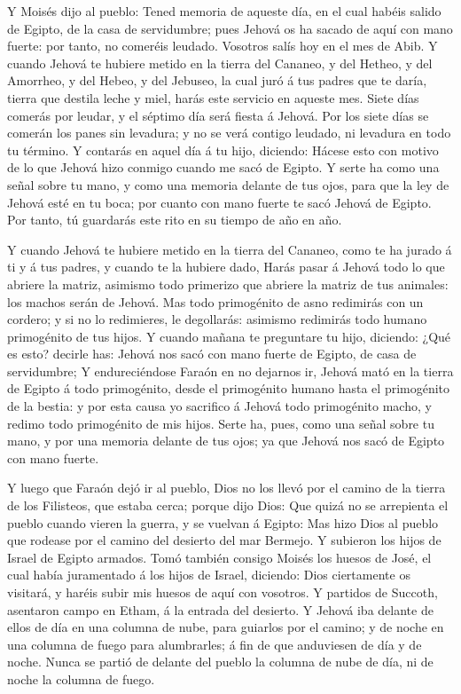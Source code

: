  Y Moisés dijo al pueblo: Tened memoria de aqueste día, en
el cual habéis salido de Egipto, de la casa de servidumbre; pues Jehová
os ha sacado de aquí con mano fuerte: por tanto, no comeréis leudado.
 Vosotros salís hoy en el mes de Abib.  Y cuando
Jehová te hubiere metido en la tierra del Cananeo, y del Hetheo, y del
Amorrheo, y del Hebeo, y del Jebuseo, la cual juró á tus padres que te
daría, tierra que destila leche y miel, harás este servicio en aqueste
mes.  Siete días comerás por leudar, y el séptimo día será
fiesta á Jehová.  Por los siete días se comerán los panes
sin levadura; y no se verá contigo leudado, ni levadura en todo tu
término.  Y contarás en aquel día á tu hijo, diciendo:
Hácese esto con motivo de lo que Jehová hizo conmigo cuando me sacó de
Egipto.  Y serte ha como una señal sobre tu mano, y como una
memoria delante de tus ojos, para que la ley de Jehová esté en tu boca;
por cuanto con mano fuerte te sacó Jehová de Egipto.  Por
tanto, tú guardarás este rito en su tiempo de año en año.

 Y cuando Jehová te hubiere metido en la tierra del
Cananeo, como te ha jurado á ti y á tus padres, y cuando te la hubiere
dado,  Harás pasar á Jehová todo lo que abriere la matriz,
asimismo todo primerizo que abriere la matriz de tus animales: los
machos serán de Jehová.  Mas todo primogénito de asno
redimirás con un cordero; y si no lo redimieres, le degollarás: asimismo
redimirás todo humano primogénito de tus hijos.  Y cuando
mañana te preguntare tu hijo, diciendo: ¿Qué es esto? decirle has:
Jehová nos sacó con mano fuerte de Egipto, de casa de servidumbre;
 Y endureciéndose Faraón en no dejarnos ir, Jehová mató en
la tierra de Egipto á todo primogénito, desde el primogénito humano
hasta el primogénito de la bestia: y por esta causa yo sacrifico á
Jehová todo primogénito macho, y redimo todo primogénito de mis hijos.
 Serte ha, pues, como una señal sobre tu mano, y por una
memoria delante de tus ojos; ya que Jehová nos sacó de Egipto con mano
fuerte.

 Y luego que Faraón dejó ir al pueblo, Dios no los llevó
por el camino de la tierra de los Filisteos, que estaba cerca; porque
dijo Dios: Que quizá no se arrepienta el pueblo cuando vieren la guerra,
y se vuelvan á Egipto:  Mas hizo Dios al pueblo que rodease
por el camino del desierto del mar Bermejo. Y subieron los hijos de
Israel de Egipto armados.  Tomó también consigo Moisés los
huesos de José, el cual había juramentado á los hijos de Israel,
diciendo: Dios ciertamente os visitará, y haréis subir mis huesos de
aquí con vosotros.  Y partidos de Succoth, asentaron campo
en Etham, á la entrada del desierto.  Y Jehová iba delante
de ellos de día en una columna de nube, para guiarlos por el camino; y
de noche en una columna de fuego para alumbrarles; á fin de que
anduviesen de día y de noche.  Nunca se partió de delante
del pueblo la columna de nube de día, ni de noche la columna de fuego.

